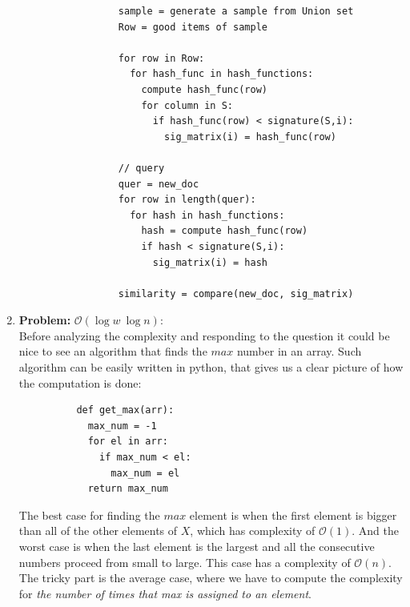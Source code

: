 \documentclass[11pt,a4paper,english]{article}
\begin{document}
\begin{enumerate}
\begin{enumerate}
            \begin{verbatim}
              sample = generate a sample from Union set
              Row = good items of sample

              for row in Row:
                for hash_func in hash_functions:
                  compute hash_func(row)
                  for column in S:
                    if hash_func(row) < signature(S,i):
                      sig_matrix(i) = hash_func(row)

              // query
              quer = new_doc
              for row in length(quer):
                for hash in hash_functions:
                  hash = compute hash_func(row)
                  if hash < signature(S,i):
                    sig_matrix(i) = hash

              similarity = compare(new_doc, sig_matrix)
            \end{verbatim}
        \end{enumerate}

      \item \textbf{Problem:} $\mathcal{O}(\log{w}\ \log{n})$: \\
        Before analyzing the complexity and responding to the question it could be nice to see an algorithm that finds the $max$ number in an array. Such algorithm can be easily written in python, that gives us a clear picture of how the computation is done:
        \begin{verbatim}
          def get_max(arr):
            max_num = -1
            for el in arr:
              if max_num < el:
                max_num = el
            return max_num
        \end{verbatim}

        The best case for finding the $max$ element is when the first element is bigger than all of the other elements of $X$, which has complexity of $\mathcal{O}(1)$. And the worst case is when the last element is the largest and all the consecutive numbers proceed from small to large. This case has a complexity of $\mathcal{O}(n)$. The tricky part is the average case, where we have to compute the complexity for \textit{the number of times that max is assigned to an element}.


\end{enumerate}
\end{document}
